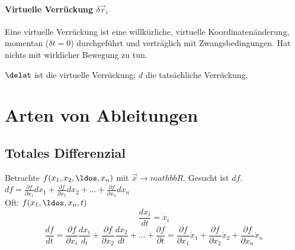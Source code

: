 \paragraph{Virtuelle Verrückung $\delta \vec r_i$}
Eine virtuelle Verrückung ist eine willkürliche, virtuelle Koordinatenänderung, momentan ($\delta t = 0$) durchgeführt und verträglich mit Zwangsbedingungen. Hat nichts mit wirklicher Bewegung zu tun.

$\delat$ ist die virtuelle Verrückung; $d$ die tatsächliche Verrückung.


\section{Arten von Ableitungen}
\subsection{Totales Differenzial}
Betrachte $f(x_1, x_2, \ldos, x_n)$ mit $\vec x \rightarrow mathbb{R}$. Gesucht ist $df$.\\

$df = \frac{\partial f}{\partial x_1} dx_1 + \frac{\partial f}{\partial x_2} dx_2 + \ldots + \frac{\partial f}{\partial x_n} dx_n$\\

Oft: $f(x_1, \ldos, x_n, t)$
\[ \frac{dx_i}{dt} = \dot x_i \]
\[ \frac{df}{dt} = \frac{\partial f}{\partial x_i} \frac{d x_i}{d_t} + \frac{\partial f}{\partial x_2} \frac{d x_2}{d t} + \ldots + \frac{\partial f}{\partial t} = \frac{\partial f}{\partial x_1} \dot x_1 + \frac{\partial f}{\partial x_2} \dot x_2 + \frac{\partial f}{\partial x_n} \dot x_n \]